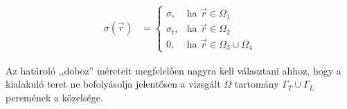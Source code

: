     \begin{align}
        \sigma(\vec{r}) &=
            \begin{cases}
                \sigma, & \text{ha } \vec{r} \in \Omega_1\\
                \sigma_t, & \text{ha } \vec{r} \in \Omega_2\\
                0, & \text{ha } \vec{r} \in \Omega_3 \cup \Omega_4
            \end{cases}
    \end{align}

    Az határoló ,,doboz'' méreteit megfelelően nagyra kell választani ahhoz, hogy a kialakuló teret ne befolyásolja jelentősen a vizsgált $\Omega$ tartomány $\Gamma_T \cup \Gamma_L$ peremének a közelsége.
    

